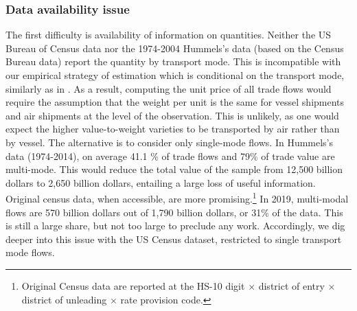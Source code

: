 \documentclass[a4paper,11pt]{article}
\begin{document}



\subsubsection{Data availability issue}

The first difficulty is availability of information on quantities. Neither the US Bureau of Census data nor the 1974-2004 Hummels's data (based on the Census Bureau data) report the quantity by transport mode. This is incompatible with our empirical strategy of estimation which is conditional on the transport mode, similarly as in \cite{hummels2007}. As a result, computing the unit price of all trade flows would require the assumption that the weight per unit is the same for vessel shipments and air shipments at the level of the observation. This is unlikely, as one would expect the higher value-to-weight varieties to be transported by air rather than by vessel. The alternative is to consider only single-mode flows. In Hummels's data (1974-2014), on average 41.1 \% of trade flows and 79\% of trade value are multi-mode. This would reduce the total value of the sample from 12,500 billion dollars to 2,650 billion dollars, entailing a large loss of useful information. Original census data, when accessible, are more promising.\footnote{Original Census data are  reported at the HS-10 digit $\times$ district of entry $\times$ district of unleading $\times$ rate provision code.} In 2019, multi-modal flows are 570 billion dollars out of 1,790 billion dollars, or 31\% of the data. This is still a large share, but not too large to preclude any work. Accordingly, we dig deeper into this issue with the US Census dataset, restricted to single transport mode flows. \smallskip
\end{document}

